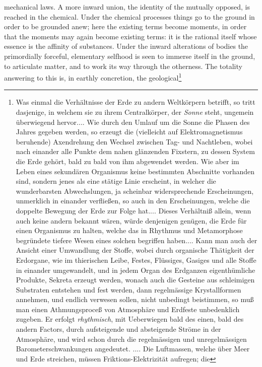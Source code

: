 \documentclass[12pt,a4paper]{book}
\begin{document}
\setcounter{footnote}{0}
mechanical laws. A more inward union, the identity of the mutually opposed, is
reached in the chemical. Under the chemical processes things go to the ground
in order to be grounded anew; here the existing terms become moments, in order
that the moments may again become existing terms: it is the rational itself
whose essence is the affinity of substances. Under the inward alterations of
bodies the primordially forceful, elementary selfhood is seen to immerse itself
in the ground, to articulate matter, and to work its way through the otherness.
The totality answering to this is, in earthly concretion, the
geological\footnote{Was einmal die Verhältnisse der
Erde zu andern Weltkörpern betrifft, so tritt dasjenige, in welchem
sie zu ihrem Centralkörper, der \emph{Sonne} steht, ungemein überwiegend
hervor.... Wie durch den Umlauf um die Sonne die Phasen des Jahres
gegeben werden, so erzeugt die (vielleicht auf Elektromagnetismus
beruhende) Axendrehung den Wechsel zwischen Tag- und Nachtleben, wobei
nach einander alle Punkte dem nahen glänzenden Fixstern, zu dessen
System die Erde gehört, bald zu bald von ihm abgewendet werden. Wie
aber im Leben eines sekundären Organismus keine bestimmten Abschnitte
vorhanden sind, sondern jenes als eine stätige Linie erscheint, in
welcher die wunderbarsten Abwechslungen, ja scheinbar widersprechende
Erscheinungen, unmerklich in einander verfließen, so auch in den
Erscheinungen, welche die doppelte Bewegung der Erde zur Folge hat....
Dieses Verhältniß allein, wenn auch keine andern bekannt wären, würde
denjenigen genügen, die Erde für einen Organismus zu halten, welche
das in Rhythmus und Metamorphose begründete tiefere Wesen eines
solchen begriffen haben.... Kann man auch der Ansicht einer
Umwandlung der Stoffe, wobei durch organische Thätigkeit der
Erdorgane, wie im thierischen Leibe, Festes, Flüssiges, Gasiges und
alle Stoffe in einander umgewandelt, und in jedem Organ des
Erdganzen eigenthümliche Produkte, Sekreta erzeugt werden, wonach
auch die Gesteine aus schleimigen Substraten entstehen und fest
werden, dann regelmässige Krystallformen annehmen, und endlich
verwesen sollen, nicht unbedingt beistimmen, so muß man einen
Athmungsproceß von Atmosphäre und Erdfeste unbedenklich zugeben. Er
erfolgt \emph{rhythmisch}, mit Ueberwiegen bald des einen, bald des
andern
Factors, durch aufsteigende und absteigende Ströme in der Atmosphäre,
und wird schon durch die regelmässigen und unregelmässigen
Barometerschwankungen angedeutet. .... Die Luftmassen, welche über
Meer und Erde streichen, müssen Friktions-Elektrizität aufregen; die
}
\end{document}
